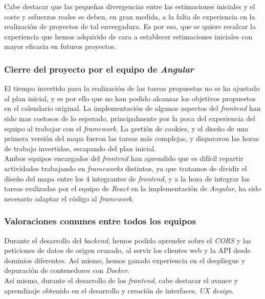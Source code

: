 \documentclass[11pt, a4paper, titlepage]{article}
\begin{document}
Cabe destacar que las pequeñas divergencias entre las estimaciones iniciales y el coste y esfuerzos reales se deben, en gran medida, a la falta de experiencia en la realización de proyectos de tal envergadura. Es por eso, que se quiere recalcar la experiencia que hemos adquirido de cara a establecer estimaciones iniciales con mayor eficacia en futuros proyectos. \\


\subsubsection{Cierre del proyecto por el equipo de \textit{Angular}}

El tiempo invertido para la realización de las tareas propuestas no se ha ajustado al plan inicial, y es por ello que no han podido alcanzar los objetivos propuestos en el calendario original. La implementación de algunos aspectos del \textit{frontend} han sido mas costosos de lo esperado, principalmente por la poca del experiencia del equipo al trabajar con el \textit{framework}. La gestión de cookies, y el diseño de una primera versión del mapa fueron las tareas más complejas, y dispararon las horas de trabajo invertidas, escapando del plan inicial.
\\

Ambos equipos encargados del \textit{frontend} han aprendido que es difícil repartir actividades trabajando en \textit{frameworks} distintos, ya que tratamos de dividir el diseño del mapa entre los 4 integrantes de \textit{frontend}, y a la hora de integrar las tareas realizadas por el equipo de \textit{React} en la implementación de \textit{Angular}, ha sido necesario adaptar el código al \textit{framework}. \\


\subsubsection{Valoraciones comunes entre todos los equipos}



Durante el desarrollo del \textit{backend}, hemos podido aprender sobre el \textit{CORS} y las peticiones de datos de origen cruzado, al servir los clientes web y la API desde dominios diferentes. Así mismo, hemos ganado experiencia en el despliegue y depuración de contenedores con \textit{Docker}. \\

Así mismo, durante el desarrollo de los \textit{frontend}, cabe destacar el avance y aprendizaje obtenido en el desarrollo y creación de interfaces, \textit{UX design}.\\
\end{document}
